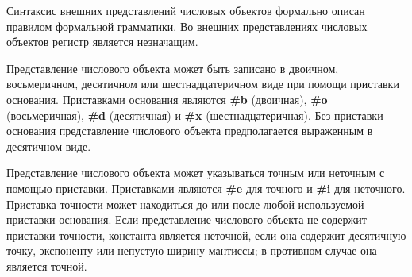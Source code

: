 Синтаксис внешних представлений числовых объектов формально описан правилом 
формальной грамматики. Во внешних представлениях числовых объектов регистр является незначащим.

Представление числового объекта может быть записано в двоичном, восьмеричном, десятичном или
шестнадцатеричном виде при помощи приставки основания. Приставками основания являются
{\bfseries\cf \#b} (двоичная), {\bfseries\cf \#o} (восьмеричная),
{\bfseries\cf \#d} (десятичная) и {\bfseries\cf \#x}
(шестнадцатеричная). Без приставки основания представление числового объекта предполагается
выраженным в десятичном виде.

Представление числового объекта может указываться точным или неточным с помощью
приставки. Приставками являются {\bfseries\cf \#e} для точного и {\bfseries\cf
  \#i} для неточного. Приставка точности может находиться до или после любой
используемой приставки основания. Если представление числового объекта не содержит приставки
точности, константа является неточной, если она содержит десятичную точку, экспоненту или
непустую ширину мантиссы; в противном случае она является точной.

